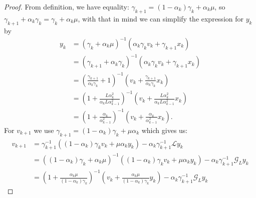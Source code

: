 \documentclass[12pt]{article}
\begin{document}
    \begin{proof}
                
        From definition,  we have equality: $\gamma_{k + 1} = (1 - \alpha_k)\gamma_k + \alpha_k \mu$, so $\gamma_{k + 1} + \alpha_k \gamma_k = \gamma_k + \alpha_k \mu$, with that in mind we can simplify the expression for $y_k$ by 
        \begin{align*}
            y_{k} &= 
            (\gamma_k + \alpha_k \mu)^{-1}
            (\alpha_k \gamma_k v_k + \gamma_{k + 1}x_k)
            \\
            &= 
            (\gamma_{k + 1} + \alpha_k \gamma_k)^{-1}
            (\alpha_k \gamma_k v_k + \gamma_{k + 1}x_k)
            \\
            &= 
            \left(
                \frac{\gamma_{k + 1}}{\alpha_k\gamma_k} + 1
            \right)^{-1}
            \left(
                v_k + \frac{\gamma_{k + 1}}{\alpha_k \gamma_k} x_k
            \right)
            \\
            &= 
            \left(
                1 + \frac{L\alpha_k^2}{\alpha_kL\alpha_{k - 1}^2} 
            \right)^{-1}
            \left(
                v_k + \frac{L\alpha_k^2}{\alpha_k L\alpha_{k - 1}^2} x_k
            \right)
            \\
            &= 
            \left(
                1 + \frac{\alpha_k}{\alpha_{k - 1}^2}
            \right)^{-1}
            \left(
                v_k + 
                \frac{\alpha_k}{\alpha_{k - 1}^2} x_k
            \right). 
        \end{align*}
        For $v_{k + 1}$ we use $\gamma_{k + 1} = (1 - \alpha_k)\gamma_k + \mu \alpha_k$ which gives us: 
        \begin{align*}
            v_{k + 1} &= 
            \gamma_{k + 1}^{-1}
            ((1 - \alpha_k)\gamma_k v_k + \mu\alpha_k y_k)
            - \alpha_k\gamma_{k + 1}^{-1}\mathcal L y_k
            \\
            &= 
            ((1 - \alpha_k)\gamma_k + \alpha_k \mu)^{-1}
            \left(
                (1 - \alpha_k)\gamma_k v_k + \mu\alpha_k y_k
            \right)
            - \alpha_k\gamma_{k + 1}^{-1}\mathcal G_L y_k
            \\
            &= 
            \left(
                1 + \frac{\alpha_k\mu}{(1 - \alpha_k)\gamma_k}
            \right)^{-1}
            \left(
                v_k + 
                \frac{\alpha_k\mu}{(1 - \alpha_k)\gamma_k} y_k
            \right)
            - \alpha_k\gamma_{k + 1}^{-1}\mathcal G_L y_k

\end{align*}
\end{proof}
\end{document}
